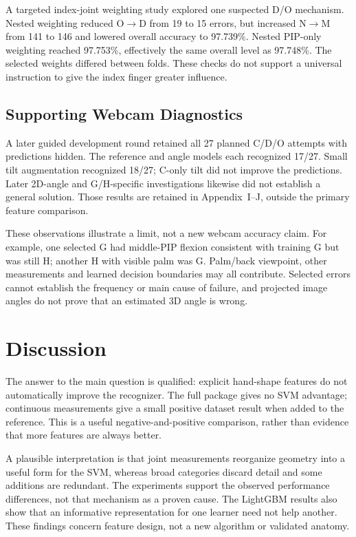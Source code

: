 \documentclass{article}
\begin{document}
A targeted index-joint weighting study explored one suspected D/O mechanism. Nested weighting reduced O$\rightarrow$D from 19 to 15 errors, but increased N$\rightarrow$M from 141 to 146 and lowered overall accuracy to 97.739\%. Nested PIP-only weighting reached 97.753\%, effectively the same overall level as 97.748\%. The selected weights differed between folds. These checks do not support a universal instruction to give the index finger greater influence.

\subsection{Supporting Webcam Diagnostics}
A later guided development round retained all 27 planned C/D/O attempts with predictions hidden. The reference and angle models each recognized 17/27. Small tilt augmentation recognized 18/27; C-only tilt did not improve the predictions. Later 2D-angle and G/H-specific investigations likewise did not establish a general solution. Those results are retained in Appendix~I--J, outside the primary feature comparison.

These observations illustrate a limit, not a new webcam accuracy claim. For example, one selected G had middle-PIP flexion consistent with training G but was still H; another H with visible palm was G. Palm/back viewpoint, other measurements and learned decision boundaries may all contribute. Selected errors cannot establish the frequency or main cause of failure, and projected image angles do not prove that an estimated 3D angle is wrong.

\section{Discussion}
The answer to the main question is qualified: explicit hand-shape features do not automatically improve the recognizer. The full package gives no SVM advantage; continuous measurements give a small positive dataset result when added to the reference. This is a useful negative-and-positive comparison, rather than evidence that more features are always better.

A plausible interpretation is that joint measurements reorganize geometry into a useful form for the SVM, whereas broad categories discard detail and some additions are redundant. The experiments support the observed performance differences, not that mechanism as a proven cause. The LightGBM results also show that an informative representation for one learner need not help another. These findings concern feature design, not a new algorithm or validated anatomy.
\end{document}
